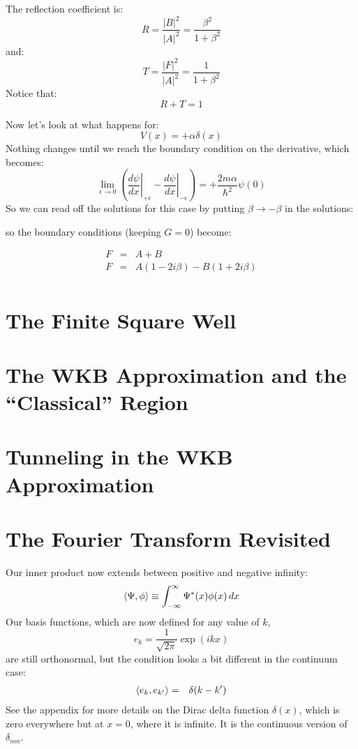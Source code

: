 \documentclass[12pt]{book}
\begin{document}
The reflection coefficient is:
$$R = \frac{|B|^2}{|A|^2} = \frac{\beta^2}{1+\beta^2}$$
and:
$$T = \frac{|F|^2}{|A|^2} = \frac{1}{1+\beta^2}$$
Notice that:
$$R+T=1$$

Now let's look at what happens for:
$$V(x) = +\alpha \delta(x)$$
Nothing changes until we reach the boundary condition on the derivative, which becomes:
$$
\lim_{\epsilon \to 0} \left( \left. \frac{d\psi}{d x} \right\rvert_{+\epsilon} 
- \left. \frac{d\psi}{d x} \right\rvert_{-\epsilon} \right) = 
+\frac{2m\alpha}{\hbar^2} \psi(0) 
$$
So we can read off the solutions for this case by putting $\beta \to -\beta$ in the solutions:


so the boundary conditions (keeping $G=0$) become:

\begin{eqnarray*}
F &=& A+B \\
F &=& A (1-2i\beta) - B (1+2i\beta)\\
\end{eqnarray*}




\section{The Finite Square Well}

\section{The WKB Approximation and the ``Classical'' Region}

\section{Tunneling in the WKB Approximation }


\section{The Fourier Transform Revisited}

Our inner product now extends between positive and negative infinity:
\begin{equation}
\braket{\Psi, \phi} \equiv \int_{-\infty}^{\infty} \Psi^*(x) \phi(x) \, dx
\end{equation}
Our basis functions, which are now defined for any value of $k$,
\begin{equation}
e_k = \frac{1}{\sqrt{2\pi}} \exp(i k x)
\end{equation}
are still orthonormal, but the condition looks a bit different in the continuum case:
\begin{eqnarray*}
\braket{e_k, e_{k'}} &=& \delta(k-k')
\end{eqnarray*}
See the appendix for more details on the Dirac delta function $\delta(x)$, which is zero everywhere but at $x=0$, where it is infinite.  It is the continuous version of $\delta_{nm}$.
\end{document}
